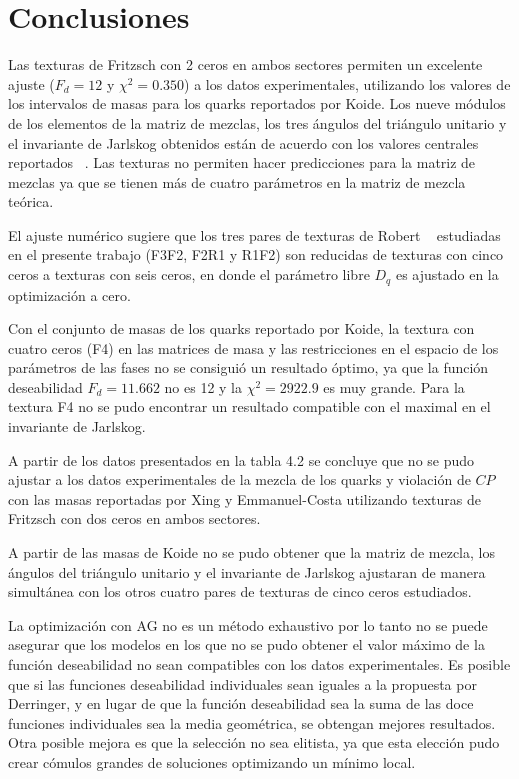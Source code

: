 \chapter{Conclusiones}

Las texturas de Fritzsch con 2 ceros en ambos sectores permiten un excelente 
ajuste ($F_d=12$ y $\chi^2=0.350$) a los datos experimentales, utilizando los
 valores de los intervalos de masas para los quarks reportados por Koide. Los 
nueve m\'odulos de los elementos de la matriz de mezclas, los tres \'angulos del
tri\'angulo unitario y el invariante de Jarlskog obtenidos est\'an de acuerdo 
con los valores centrales reportados ~\cite{Nak201001}. Las texturas no permiten
hacer predicciones para la matriz de mezclas ya que se tienen m\'as de cuatro 
par\'ametros en la matriz de mezcla te\'orica.

El ajuste num\'erico sugiere que los tres pares de texturas de Robert 
~\cite{rrr} estudiadas en el presente trabajo (F3F2, F2R1 y R1F2) son reducidas 
de texturas con cinco ceros a texturas con seis ceros, en donde el par\'ametro 
libre $D_q$ es ajustado en la optimizaci\'on a cero. 

Con el conjunto de masas de los quarks reportado por Koide, la textura con
cuatro ceros (F4) en las matrices de masa y las restricciones en el espacio de
los par\'ametros de las fases no se consigui\'o un resultado \'optimo, ya que la
funci\'on deseabilidad $F_d=11.662$ no es 12 y la $\chi^2=2922.9$ es muy grande.
Para la textura F4 no se pudo encontrar un resultado compatible con el maximal
en el invariante de Jarlskog.

A partir de los datos presentados en la tabla 4.2 se concluye que no se 
pudo ajustar a los datos experimentales de la mezcla de los quarks y 
violaci\'on de $CP$ con las masas reportadas por Xing y Emmanuel-Costa 
utilizando texturas de Fritzsch con dos ceros en ambos sectores. 

A partir de las masas de Koide no se pudo obtener que la matriz de mezcla, los
\'angulos del tri\'angulo unitario y el invariante de Jarlskog ajustaran de
manera simult\'anea con los otros cuatro pares de texturas de cinco ceros
estudiados.

La optimizaci\'on con AG no es un m\'etodo exhaustivo por lo tanto no se puede
asegurar que los modelos en los que no se pudo obtener el valor m\'aximo de la
funci\'on deseabilidad no sean compatibles con los datos experimentales. 
Es posible que si las funciones
deseabilidad individuales sean iguales a la propuesta por Derringer, y en lugar
de que la funci\'on deseabilidad sea la suma de las doce funciones individuales
sea la media geom\'etrica, se obtengan mejores resultados. Otra posible mejora
es que la selecci\'on no sea elitista, ya que esta elecci\'on pudo crear 
c\'omulos grandes de soluciones optimizando un m\'inimo local.

